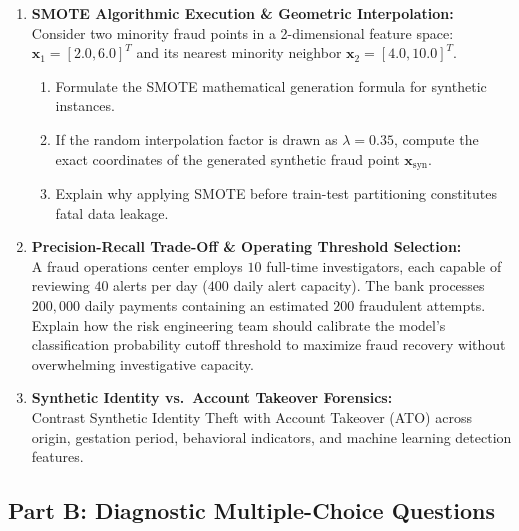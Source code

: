 \begin{enumerate}[label=\textbf{P9.\arabic*}]
    \item \textbf{SMOTE Algorithmic Execution \& Geometric Interpolation:}\\
    Consider two minority fraud points in a 2-dimensional feature space: $\mathbf{x}_1 = [2.0, 6.0]^T$ and its nearest minority neighbor $\mathbf{x}_2 = [4.0, 10.0]^T$.
    \begin{enumerate}[label=(\alph*)]
        \item Formulate the SMOTE mathematical generation formula for synthetic instances.
        \item If the random interpolation factor is drawn as $\lambda = 0.35$, compute the exact coordinates of the generated synthetic fraud point $\mathbf{x}_{\text{syn}}$.
        \item Explain why applying SMOTE before train-test partitioning constitutes fatal data leakage.
    \end{enumerate}

    \item \textbf{Precision-Recall Trade-Off \& Operating Threshold Selection:}\\
    A fraud operations center employs $10$ full-time investigators, each capable of reviewing $40$ alerts per day ($400$ daily alert capacity). The bank processes $200{,}000$ daily payments containing an estimated $200$ fraudulent attempts.
    Explain how the risk engineering team should calibrate the model's classification probability cutoff threshold to maximize fraud recovery without overwhelming investigative capacity.

    \item \textbf{Synthetic Identity vs.~Account Takeover Forensics:}\\
    Contrast Synthetic Identity Theft with Account Takeover (ATO) across origin, gestation period, behavioral indicators, and machine learning detection features.
\end{enumerate}

\subsection*{Part B: Diagnostic Multiple-Choice Questions}


